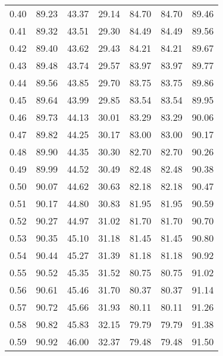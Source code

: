 \begin{tabular}{|c|c|c|c|c|c|c|}
      0.40 &     89.23 &     43.37 &      29.14 &   84.70 &      84.70 &         89.46 \\
      0.41 &     89.32 &     43.51 &      29.30 &   84.49 &      84.49 &         89.56 \\
      0.42 &     89.40 &     43.62 &      29.43 &   84.21 &      84.21 &         89.67 \\
      0.43 &     89.48 &     43.74 &      29.57 &   83.97 &      83.97 &         89.77 \\
      0.44 &     89.56 &     43.85 &      29.70 &   83.75 &      83.75 &         89.86 \\
      0.45 &     89.64 &     43.99 &      29.85 &   83.54 &      83.54 &         89.95 \\
      0.46 &     89.73 &     44.13 &      30.01 &   83.29 &      83.29 &         90.06 \\
      0.47 &     89.82 &     44.25 &      30.17 &   83.00 &      83.00 &         90.17 \\
      0.48 &     89.90 &     44.35 &      30.30 &   82.70 &      82.70 &         90.26 \\
      0.49 &     89.99 &     44.52 &      30.49 &   82.48 &      82.48 &         90.38 \\
      0.50 &     90.07 &     44.62 &      30.63 &   82.18 &      82.18 &         90.47 \\
      0.51 &     90.17 &     44.80 &      30.83 &   81.95 &      81.95 &         90.59 \\
      0.52 &     90.27 &     44.97 &      31.02 &   81.70 &      81.70 &         90.70 \\
      0.53 &     90.35 &     45.10 &      31.18 &   81.45 &      81.45 &         90.80 \\
      0.54 &     90.44 &     45.27 &      31.39 &   81.18 &      81.18 &         90.92 \\
      0.55 &     90.52 &     45.35 &      31.52 &   80.75 &      80.75 &         91.02 \\
      0.56 &     90.61 &     45.46 &      31.70 &   80.37 &      80.37 &         91.14 \\
      0.57 &     90.72 &     45.66 &      31.93 &   80.11 &      80.11 &         91.26 \\
      0.58 &     90.82 &     45.83 &      32.15 &   79.79 &      79.79 &         91.38 \\
      0.59 &     90.92 &     46.00 &      32.37 &   79.48 &      79.48 &         91.50 \\

\end{tabular}
